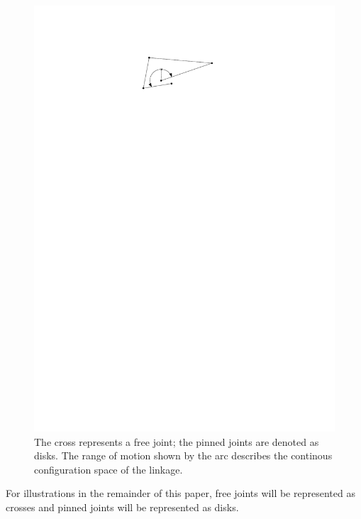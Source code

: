 \begin{figure}[h]
\begin{center}
\includegraphics{graphics/freeJointPinnedJoint.pdf}
\end{center} 
\caption{The cross represents a free joint; the pinned joints are denoted as disks.  The range of motion shown by the arc describes the continous configuration space of the linkage.}
\end{figure} 

For illustrations in the remainder of this paper, free joints will be represented as crosses and pinned joints will be represented as disks.
